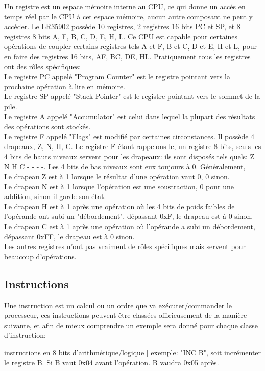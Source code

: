 \documentclass{report}
\begin{document}
Un registre est un espace mémoire interne au CPU, ce qui donne un accés en temps réel par le CPU à cet espace mémoire, aucun autre composant ne peut y accéder.
Le LR35902 possède 10 registres, 2 registres 16 bits PC et SP, et 8 registres 8 bits A, F, B, C, D, E, H, L.
Ce CPU est capable pour certaines opérations de coupler certains registres tels A et F, B et C, D et E, H et L, pour en faire des registres 16 bits, AF, BC, DE, HL.
Pratiquement tous les registres ont des rôles spécifiques:\\
Le registre PC appelé "Program Counter" est le registre pointant vers la prochaine opération à lire en mémoire.\\
Le registre SP appelé "Stack Pointer" est le registre pointant vers le sommet de la pile.\\
Le registre A appelé "Accumulator" est celui dans lequel la plupart des résultats des opérations sont stockés.\\
Le registre F appelé "Flags" est modifié par certaines circonstances.
Il possède 4 drapeaux, Z, N, H, C.
Le registre F étant rappelons le, un registre 8 bits, seuls les 4 bits de hauts niveaux servent pour les drapeaux:
ils sont disposés tels quels: Z N H C - - - -. Les 4 bits de bas niveaux sont eux toujours à 0.
Généralement, \\Le drapeau Z est à 1 lorsque le résultat d'une opération vaut 0, 0 sinon.\\
Le drapeau N est à 1 lorsque l'opération est une soustraction, 0 pour une addition, sinon il garde son état.\\
Le drapeau H est à 1 après une opération où les 4 bits de poids faibles de l'opérande ont subi un "débordement", dépassant 0xF, le drapeau est à 0 sinon.\\
Le drapeau C est à 1 après une opération où l'opérande a subi un débordement, dépassant 0xFF, le drapeau est à 0 sinon.\\
Les autres registres n'ont pas vraiment de rôles spécifiques mais servent pour beaucoup d'opérations.
\subsection{Instructions}
Une instruction est un calcul ou un ordre que va exécuter/commander le processeur, ces instructions peuvent être classées officieusement de la manière suivante, et afin de mieux comprendre un exemple sera donné pour chaque classe d'instruction:

instructions en 8 bits d'arithmétique/logique | exemple: "INC B", soit incrémenter le registre B. Si B vaut 0x04 avant l'opération. B vaudra 0x05 après.
\end{document}
